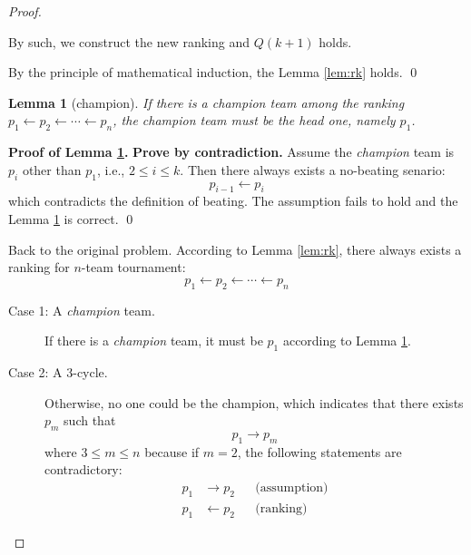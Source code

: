 \documentclass[12pt,a4paper]{article}
\newtheorem{lemma}[theorem]{Lemma}
\theoremstyle{definition}
\begin{document}
\begin{enumerate}
\begin{proof}
\begin{description}
\begin{minipage}{0.88\textwidth}
\begin{algorithm}[H]
            \;
        \end{algorithm}    
        \end{minipage}

        By such, we construct the new ranking and $Q(k+1)$ holds.
    \end{description}
    By the principle of mathematical induction, the Lemma \ref{lem:rk} holds.
    \hfil \qed \vspace{\parskip}

    \begin{lemma}[champion]\label{lem:ch}
        If there is a \emph{champion} team among the ranking $p_1\leftarrow p_2\leftarrow\cdots\leftarrow p_n$, the \emph{champion} team must be the head one, namely $p_1$.
    \end{lemma}
    \vspace{-2\parskip}
    \textbf{Proof of Lemma \ref{lem:ch}.}
    \textbf{Prove by contradiction.} Assume the \emph{champion} team is $p_i$ other than $p_1$, i.e., $2\leq i \leq k$. Then there always exists a no-beating senario:
    \begin{equation*}
        p_{i-1}\leftarrow p_i
    \end{equation*}
    which contradicts the definition of beating. The assumption fails to hold and the Lemma \ref{lem:ch} is correct.
    \hfil \qed \vspace{\parskip}

    Back to the original problem. According to Lemma \ref{lem:rk}, there always exists a ranking for $n$-team tournament:
    \begin{equation*}
        p_1\leftarrow p_2\leftarrow \cdots\leftarrow p_n
    \end{equation*}
    \begin{description}
        \item[Case 1: A \emph{champion} team.] If there is a \emph{champion} team, it must be $p_1$ according to Lemma \ref{lem:ch}.
        \item[Case 2: A 3-cycle.] Otherwise, no one could be the champion, which indicates that there exists $p_m$ such that
        \begin{equation*}
            p_1\rightarrow p_m
        \end{equation*}
        where $3\leq m\leq n$ because if $m=2$, the following statements are contradictory:
        \begin{align*}
            p_1&\rightarrow p_2 && \text{(assumption)}\\
            p_1&\leftarrow p_2 && \text{(ranking)}
        \end{align*}


\end{description}
\end{proof}
\end{enumerate}
\end{document}
